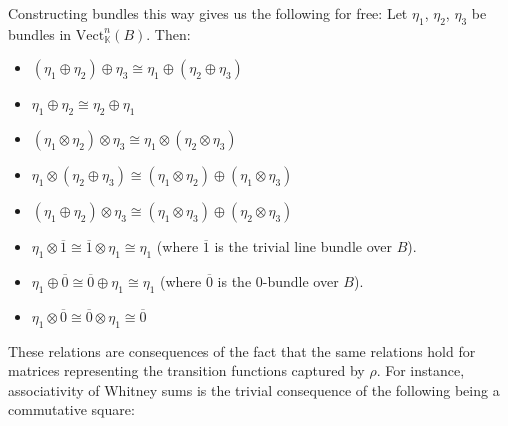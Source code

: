\documentclass[11pt,a4paper]{article}
\begin{document}
\begin{enumerate}[(I)]
Constructing bundles this way gives us the following for free: Let $\eta_1$, $\eta_2$, $\eta_3$ be bundles in $\text{Vect}_{\mathbb{K}}^n(B)$. Then:
\begin{itemize}
    \item $(\eta_1\oplus\eta_2)\oplus\eta_3 \cong \eta_1 \oplus (\eta_2\oplus\eta_3)$
    \item $\eta_1\oplus\eta_2\cong\eta_2\oplus\eta_1$
    \item $(\eta_1\otimes\eta_2)\otimes\eta_3 \cong \eta_1 \otimes (\eta_2\otimes\eta_3)$
    \item $\eta_1\otimes(\eta_2\oplus\eta_3) \cong (\eta_1\otimes\eta_2)\oplus (\eta_1\otimes\eta_3)$
    \item $(\eta_1\oplus\eta_2)\otimes\eta_3 \cong (\eta_1\otimes\eta_3)\oplus (\eta_2\otimes\eta_3)$
    \item $\eta_1\otimes\overline{1} \cong \overline{1}\otimes\eta_1 \cong \eta_1$ (where $\overline{1}$ is the trivial line bundle over $B$).
    \item $\eta_1\oplus\overline{0} \cong \overline{0}\oplus\eta_1 \cong \eta_1$ (where $\overline{0}$ is the $0$-bundle over $B$).
    \item $\eta_1\otimes\overline{0} \cong \overline{0}\otimes\eta_1 \cong \overline{0}$
\end{itemize}


These relations are consequences of the fact that the same relations hold for matrices representing the transition functions captured by $\rho$. For instance, associativity of Whitney sums is the trivial consequence of the following being a commutative square:


\end{enumerate}
\end{document}
